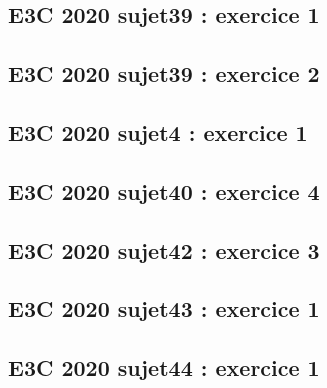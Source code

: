 \documentclass[lang=fr,edition=teacher,layout=sheet]{mxbook}
\begin{document}
\begingroup\endgroup
\par\bigskip
{}\subsection*{E3C 2020 sujet39 : exercice 1}
\begingroup\endgroup
\par\bigskip
{}\subsection*{E3C 2020 sujet39 : exercice 2}
\begingroup\endgroup
\par\bigskip
{}\subsection*{E3C 2020 sujet4 : exercice 1}
\begingroup\endgroup
\par\bigskip
{}\subsection*{E3C 2020 sujet40 : exercice 4}
\begingroup\endgroup
\par\bigskip
{}\subsection*{E3C 2020 sujet42 : exercice 3}
\begingroup\endgroup
\par\bigskip
{}\subsection*{E3C 2020 sujet43 : exercice 1}
\begingroup\endgroup
\par\bigskip
{}\subsection*{E3C 2020 sujet44 : exercice 1}
\begingroup\endgroup
\end{document}
